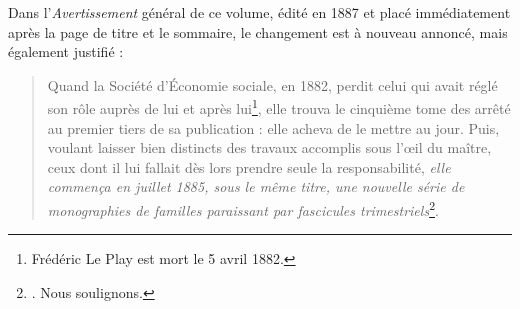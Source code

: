 Dans l'\textit{Avertissement} général de ce volume, édité en 1887 et placé immédiatement après la page de titre et le sommaire, le changement est à nouveau annoncé, mais également justifié :

\begin{quote}
    \og Quand la Société d'Économie sociale, en 1882, perdit celui qui 
avait réglé son rôle auprès de lui et après lui\footnote{Frédéric Le Play est mort le 5 avril 1882.}, elle trouva le cinquième tome des \odm{} arrêté au premier tiers de sa publication : elle acheva de le mettre au jour. Puis, voulant laisser bien distincts des travaux accomplis sous l'\oe{}il du maître, ceux dont il lui fallait dès lors prendre seule la responsabilité, \textit{elle commença en juillet 1885, sous le même titre, une nouvelle série de monographies de familles paraissant par fascicules trimestriels}\footnote{\cite[spec. p. II]{s2avert}. Nous soulignons.}. \fg{}
\end{quote}

